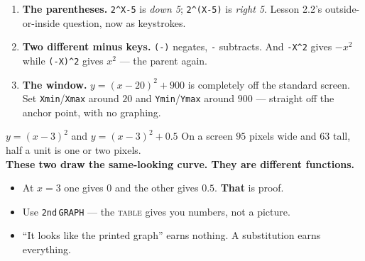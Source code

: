 \documentclass[aspectratio=169, 11pt]{beamer}
\begin{document}
\begin{frame}[t, plain]
  \begin{enumerate}
    \setlength{\itemsep}{0.3cm}
    \item \textbf{The parentheses.} \texttt{2\^{}X-5} is \emph{down 5}; \texttt{2\^{}(X-5)} is
          \emph{right 5}. Lesson 2.2's outside-or-inside question, now as keystrokes.
    \item \textbf{Two different minus keys.} \texttt{(-)} negates, \texttt{-} subtracts. And
          \texttt{-X\^{}2} gives $-x^2$ while \texttt{(-X)\^{}2} gives $x^2$ --- the parent again.
    \item \textbf{The window.} $y=(x-20)^2+900$ is completely off the standard screen. Set
          \texttt{Xmin}/\texttt{Xmax} around $20$ and \texttt{Ymin}/\texttt{Ymax} around $900$ ---
          straight off the anchor point, with no graphing.
  \end{enumerate}
\end{frame}

\begin{frame}[t, plain]
  \begin{block}{$y=(x-3)^2$ \quad and \quad $y=(x-3)^2+0.5$}
    \centering
    On a screen $95$ pixels wide and $63$ tall, half a unit is one or two pixels.\\
    \textbf{These two draw the same-looking curve. They are different functions.}
  \end{block}
  \begin{itemize}
    \setlength{\itemsep}{0.3cm}
    \item At $x=3$ one gives $0$ and the other gives $0.5$. \textbf{That} is proof.
    \item Use \texttt{2nd}\,\texttt{GRAPH} --- the \textsc{table} gives you numbers, not a picture.
    \item ``It looks like the printed graph'' earns nothing. A substitution earns everything.
  \end{itemize}
\end{frame}
\end{document}
